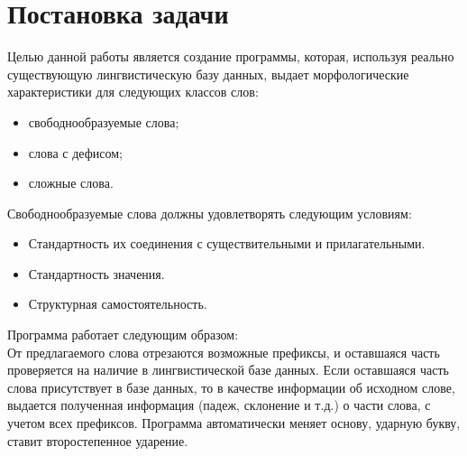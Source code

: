 \chapter{Постановка задачи} \label{chapt2}

Целью данной работы является создание программы, которая, используя реально существующую лингвистическую базу данных, выдает морфологические характеристики для следующих классов слов:
\begin{itemize}
    \item свободнообразуемые слова;
    \item слова с дефисом;
    \item сложные слова.
\end{itemize}

Свободнообразуемые слова должны удовлетворять следующим условиям:
\begin{itemize}
    \item Стандартность их соединения с существительными и прилагательными.
    \item Стандартность значения.
    \item Структурная самостоятельность.
\end{itemize}

Программа работает следующим образом: \\
От предлагаемого слова отрезаются возможные префиксы, и оставшаяся часть проверяется на наличие в лингвистической базе данных. Если оставшаяся часть слова присутствует в базе данных, то в качестве информации об исходном слове, выдается полученная информация (падеж, склонение и т.д.) о части слова, с учетом всех префиксов. Программа автоматически меняет основу, ударную букву, ставит второстепенное ударение. 

\clearpage